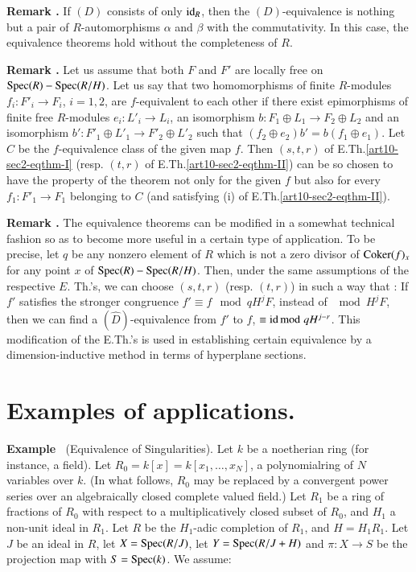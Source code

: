 \medskip
\noindent
{\bf Remark .\label{art10-sec2-rem2.4.1}}
If $(D)$ consists of only $\operatorname{\mathrm{id}}_{R}$, then the $(D)$-equivalence is nothing but a pair of $R$-automorphisms $\alpha$ and $\beta$ with the commutativity. In this case, the equivalence theorems hold without the completeness of $R$.

\medskip
\noindent
{\bf Remark .\label{art10-sec2-rem2.4.2}}
Let us assume that both $F$ and $F'$ are locally free on $\operatorname{Spec} (R)-\operatorname{Spec} (R/H)$. Let us say that two homomorphisms of finite $R$-modules $f_{i}:F'_{i}\to F_{i}$, $i=1,2$, are $f$-equivalent to each other if there exist epimorphisms of finite free $R$-modules $e_{i}:L'_{i}\to L_{i}$, an isomorphism $b:F_{1}\oplus L_{1}\to F_{2}\oplus L_{2}$ and an isomorphism $b':F'_{1}\oplus L'_{1}\to F'_{2}\oplus L'_{2}$ such that $(f_{2}\oplus e_{2})b'=b(f_{1}\oplus e_{1})$. Let $C$ be the $f$-equivalence class of the given map $f$. Then $(s,t,r)$ of E.Th.\ref{art10-sec2-eqthm-I} (resp. $(t,r)$ of E.Th.\ref{art10-sec2-eqthm-II}) can be so chosen to have the property of the theorem not only for the given $f$ but also for every $f_{1}:F'_{1}\to F_{1}$ belonging to $C$ (and satisfying (i) of E.Th.\ref{art10-sec2-eqthm-II}).

\medskip
\noindent
{\bf Remark .\label{art10-sec2-rem2.4.3}}
The equivalence theorems can be modified in a somewhat technical fashion so as to become more useful in a certain type of application. To be precise, let $q$ be any nonzero element of $R$ which is not a zero divisor of $\operatorname{\mathrm{Coker}}(f)_{x}$ for any point $x$ of $\operatorname{Spec} (R)-\operatorname{Spec}(R/H)$. Then, under the same assumptions of the respective $E$. Th.'s, we can choose $(s,t,r)$ (resp. $(t,r)$) in such a way that : If $f'$ satisfies the stronger congruence $f'\equiv f\mod qH^{j}F$, instead of $\mod H^{j}F$, then we can find a $(\widehat{D})$-equivalence from $f'$ to $f$, $\equiv \operatorname{\mathrm{id}}{\rm{mod}}\kern.3em qH^{j-r}$. This modification of the E.Th.'s is used in establishing certain equivalence by a dimension-inductive method in terms of hyperplane sections.

\section{Examples of applications.}\label{art10-sec3}

\medskip
\noindent
{\bf Example \label{art10-sec3-exam-I}}~(Equivalence of Singularities).
Let $k$ be a noetherian ring (for instance, a field). Let $R_{0}=k[x]=k[x_{1},\ldots,x_{N}]$, a polynomial\pageoriginale ring of $N$ variables over $k$. (In what follows, $R_{0}$ may be replaced by a convergent power series over an algebraically closed complete valued field.) Let $R_{1}$ be a ring of fractions of $R_{0}$ with respect to a multiplicatively closed subset of $R_{0}$, and $H_{1}$ a non-unit ideal in $R_{1}$. Let $R$ be the $H_{1}$-adic completion of $R_{1}$, and $H=H_{1}R_{1}$. Let $J$ be an ideal in $R$, let $X=\operatorname{Spec} (R/J)$, let $Y=\operatorname{Spec} (R/J+H)$ and $\pi:X\to S$ be the projection map with $S=\operatorname{Spec} (k)$. We assume:

